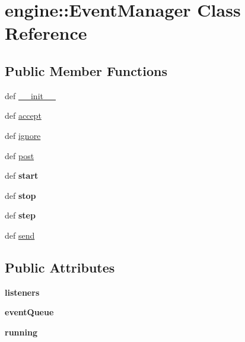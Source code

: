 \hypertarget{classengine_1_1EventManager}{
\section{engine::EventManager Class Reference}
\label{classengine_1_1EventManager}
}
\subsection*{Public Member Functions}
\begin{DoxyCompactItemize}
\item 
def \hyperlink{classengine_1_1EventManager_a9937f92e3a44e5db7cb0cff939a7e3a9}{\_\-\_\-init\_\-\_\-}
\item 
def \hyperlink{classengine_1_1EventManager_a4c2fe323a92b282bfc2b41f45db2c622}{accept}
\item 
def \hyperlink{classengine_1_1EventManager_a3cbecffdaca2a66699c41f3b2ff8d5ae}{ignore}
\item 
def \hyperlink{classengine_1_1EventManager_a80462c68550513026b2ffe34ede4fca6}{post}
\item 
\hypertarget{classengine_1_1EventManager_aaf771584ec632fe5c077a6461fa29b98}{
def {\bfseries start}}
\label{classengine_1_1EventManager_aaf771584ec632fe5c077a6461fa29b98}

\item 
\hypertarget{classengine_1_1EventManager_a5bbd01cde9fb7d71af264297bb74a8d1}{
def {\bfseries stop}}
\label{classengine_1_1EventManager_a5bbd01cde9fb7d71af264297bb74a8d1}

\item 
\hypertarget{classengine_1_1EventManager_a305869a1781643c9600c220e5a4d1a76}{
def {\bfseries step}}
\label{classengine_1_1EventManager_a305869a1781643c9600c220e5a4d1a76}

\item 
def \hyperlink{classengine_1_1EventManager_a20ef19419adf221c5632d4258f1def37}{send}
\end{DoxyCompactItemize}
\subsection*{Public Attributes}
\begin{DoxyCompactItemize}
\item 
\hypertarget{classengine_1_1EventManager_ac1ec3444ffc78a3d2303e5cf1b437630}{
{\bfseries listeners}}
\label{classengine_1_1EventManager_ac1ec3444ffc78a3d2303e5cf1b437630}

\item 
\hypertarget{classengine_1_1EventManager_a737e3b4449d2a5e311f2baaee88c91dd}{
{\bfseries eventQueue}}
\label{classengine_1_1EventManager_a737e3b4449d2a5e311f2baaee88c91dd}

\item 
\hypertarget{classengine_1_1EventManager_a825eeee99ae084c22cd26764f69298fb}{
{\bfseries running}}
\label{classengine_1_1EventManager_a825eeee99ae084c22cd26764f69298fb}

\end{DoxyCompactItemize}


